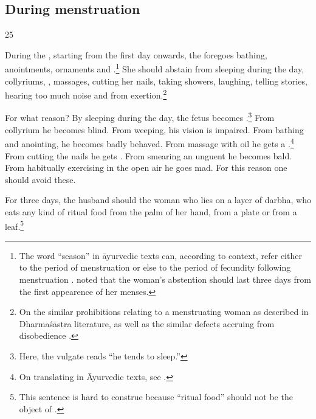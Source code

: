 \begin{translation}
 \subsection{During menstruation}
 
 \item[25]
 
During the , starting from the first day onwards, the
 foregoes bathing, anointments,
ornaments and .\footnote{The word 
    “season” in āyurvedic texts can, according to context, refer either to
    the period of menstruation or else to the period of fecundity
    following menstruation \citep[15\,ff., note 27, \emph{et
    passim}]{das-2003}.  noted that the woman's
    abstention should last three days from the first appearence of her
    menses.} She should abstain from sleeping during the day, collyriums,
    , massages, cutting her nails, taking
    showers, laughing, telling stories, hearing too much noise and from
    exertion.\footnote{On the similar prohibitions relating to a
        menstruating woman as described in Dharmaśāstra literature, as well as
        the similar defects accruing from disobedience         
        \citep[see][284--287]{lesl-1989}.}
        
For what reason?  By sleeping during the day, the fetus becomes
.\footnote{Here, the vulgate reads  “he
    tends to sleep.”} From collyrium he becomes blind.  From weeping, his
    vision is impaired. From bathing and anointing, he becomes badly
    behaved. From massage with oil he gets a .\footnote{On translating  in Āyurvedic texts, see
        \cite[96\,ff]{emme-1984}.} From cutting the nails he gets
        .  From smearing an unguent he becomes bald.
        From habitually exercising in the open air he goes mad. For this
        reason one should avoid these.
    
For three days, the husband should  the woman
who lies on a layer of \gls{darbha}, who eats any kind of ritual food
from the palm of her hand, from a plate or from a leaf.\footnote{This
    sentence is hard to construe because  “ritual food”
    should not be the object of .}

        
        
        

\end{translation}
